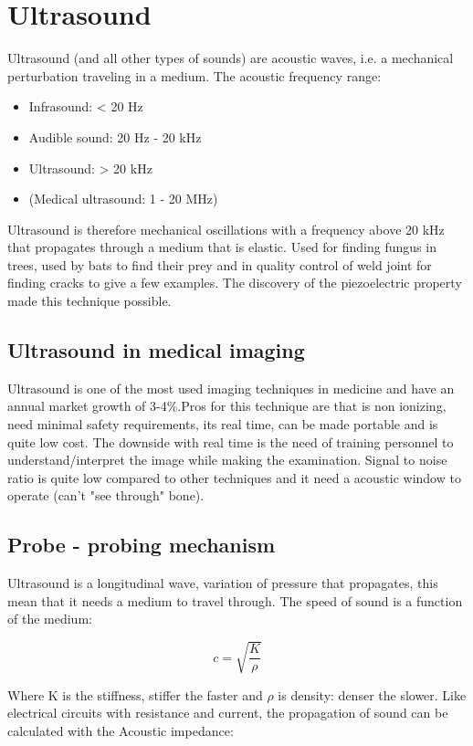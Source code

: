 \section{Ultrasound}
Ultrasound (and all other types of sounds) are acoustic waves, i.e. a mechanical perturbation traveling in a medium. The acoustic frequency range:

\begin{itemize}
	\item Infrasound: < 20 Hz
	\item Audible sound: 20 Hz - 20 kHz
	\item Ultrasound: > 20 kHz 
	\item (Medical ultrasound: 1 - 20 MHz) 
\end{itemize}

Ultrasound is therefore mechanical oscillations with a frequency above 20 kHz that propagates through a medium that is elastic. Used for finding fungus in trees, used by bats to find their prey and in quality control of weld joint for finding cracks to give a few examples. The discovery of the piezoelectric property made this technique possible. 

	\subsection{Ultrasound in medical imaging}
	Ultrasound is one of the most used imaging techniques in medicine and have an annual market growth of 3-4\%.Pros for this technique are that is non ionizing, need minimal safety requirements, its real time, can be made portable and is quite low cost. The downside with real time is the need of training personnel to understand/interpret the image while making the examination. Signal to noise ratio is quite low compared to other techniques and it need a acoustic window to operate (can't "see through" bone). 

	\subsection{Probe - probing mechanism}
	Ultrasound is a longitudinal wave, variation of pressure that propagates, this mean that it needs a medium to travel through. The speed of sound is a function of the medium:

		\begin{equation}
			c = \sqrt{\frac{K} {\rho} }		
		\end{equation}

	Where K is the stiffness, stiffer the faster and $\rho$ is density: denser the slower. Like electrical circuits with resistance and current, the propagation of sound can be calculated with the Acoustic impedance:

